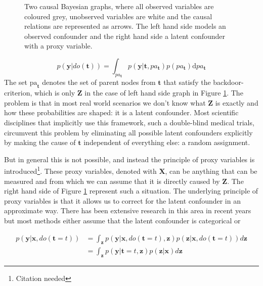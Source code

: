 \documentclass{report}
\newcommand{\bt}{\mathbf{t}}
\newcommand{\bX}{\mathbf{X}}
\newcommand{\bx}{\mathbf{x}}
\newcommand{\by}{\mathbf{y}}
\newcommand{\bZ}{\mathbf{Z}}
\newcommand{\bz}{\mathbf{z}}
\newcommand{\cneeded}{\footnote{Citation needed}}
\begin{document}
\begin{figure}
    \centering
    
    \hspace{2cm}
    
    \caption{Two causal Bayesian graphs, where all observed variables are coloured grey, unobserved variables are white and the causal relations are represented as arrows. The left hand side models an observed confounder and the right hand side a latent confounder with a proxy variable.}
    \label{fig:graph_observed_confounder_and_latent_with_proxy}
\end{figure}


\begin{equation}\label{equation:do_operation}
   p(\by | do(\bt)) = \int_{pa_\bt} p(\by | \bt, pa_{\bt}) p(pa_{\bt}) \text{d} pa_\bt
\end{equation}
The set $\text{pa}_\bt$ denotes the set of parent nodes from $\bt$ that satisfy the backdoor-criterion, which is only $\bZ$ in the case of left hand side graph in Figure \ref{fig:graph_observed_confounder_and_latent_with_proxy}. The problem is that in most real world scenarios we don't know what $\bZ$ is exactly and how these probabilities are shaped: it is a latent confounder. Most scientific disciplines that implicitly use this framework, such a double-blind medical trials, circumvent this problem by eliminating all possible latent confounders explicitly by making the cause of $\bt$ independent of everything else: a random assignment.

But in general this is not possible, and instead the principle of proxy variables is introduced\cneeded. These proxy variables, denoted with $\bX$, can be anything that can be measured and from which we can assume that it is directly caused by $\bZ$. The right hand side of Figure \ref{fig:graph_observed_confounder_and_latent_with_proxy} represent such a situation. The underlying principle of proxy variables is that it allows us to correct for the latent confounder in an approximate way. There has been extensive research in this area in recent years but most methods either assume that the latent confounder is categorical or 

\begin{equation}\label{equation:prediction_of_do_t}
    \begin{split}
        p(\by | \bx, do(\bt=t)) &= \int_{\bz} p(\by | \bx, do(\bt=t), \bz) p(\bz | \bx, do(\bt=t)) d\bz\\
        &= \int_{\bz} p(\by|\bt=t, \bz) p(\bz|\bx) d\bz
    \end{split}
\end{equation}
\end{document}
